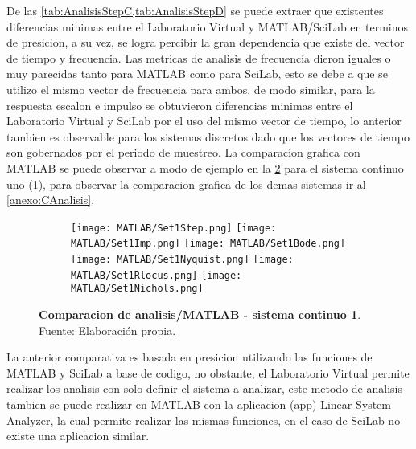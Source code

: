         De las \cref{tab:AnalisisStepC,tab:AnalisisStepD} se puede extraer que existentes diferencias minimas  entre el Laboratorio Virtual y MATLAB/SciLab en terminos de presicion, a su vez, se logra percibir la gran dependencia que existe del vector de tiempo y frecuencia. Las metricas de analisis de frecuencia dieron iguales o muy parecidas tanto para MATLAB como para SciLab, esto se debe a que se utilizo el mismo vector de frecuencia para ambos, de modo similar, para la respuesta escalon e impulso se obtuvieron diferencias minimas entre el Laboratorio Virtual y SciLab por el uso del mismo vector de tiempo, lo anterior tambien es observable para los sistemas discretos dado que los vectores de tiempo son gobernados por el periodo de muestreo. La comparacion grafica con MATLAB se puede observar a modo de ejemplo en la \cref{fig:Set1} para el sistema continuo uno (1), para observar la comparacion grafica de los demas sistemas ir al \ref{anexo:CAnalisis}.
        
        \pagebreak

        \begin{figure}[htb]
            \centering
            \begin{subfigure}[t]{0.99\textwidth}
                \centering
                \texttt{[image: MATLAB/Set1Step.png]}
                \texttt{[image: MATLAB/Set1Imp.png]}
                \texttt{[image: MATLAB/Set1Bode.png]}
                \texttt{[image: MATLAB/Set1Nyquist.png]}
                \texttt{[image: MATLAB/Set1Rlocus.png]}
                \texttt{[image: MATLAB/Set1Nichols.png]}
                \label{fig:Set1sub}
            \end{subfigure}
            \caption[Comparacion de analisis/MATLAB - sistema continuo 1]{\textbf{Comparacion de analisis/MATLAB - sistema continuo 1}. Fuente: Elaboración propia. \label{fig:Set1}}
        \end{figure}

        \clearpage

        La anterior comparativa es basada en presicion utilizando las funciones de MATLAB y SciLab a base de codigo, no obstante, el Laboratorio Virtual permite realizar los analisis con solo definir el sistema a analizar, este metodo de analisis tambien se puede realizar en MATLAB con la aplicacion (app) Linear System Analyzer, la cual permite realizar las mismas funciones, en el caso de SciLab no existe una aplicacion similar.

